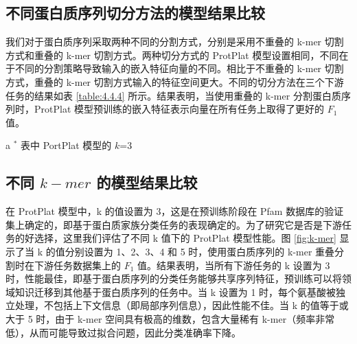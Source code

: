 \subsection{不同蛋白质序列切分方法的模型结果比较}
我们对于蛋白质序列采取两种不同的分割方式，分别是采用不重叠的 k-mer 切割方式和重叠的 k-mer 切割方式。两种切分方式的 ProtPlat 模型设置相同，不同在于不同的分割策略导致输入的嵌入特征向量的不同。相比于不重叠的 k-mer 切割方式，重叠的 k-mer 切割方式输入的特征空间更大。不同的切分方法在三个下游任务的结果如表 \ref{table:4.4.4} 所示。结果表明，当使用重叠的 k-mer 分割蛋白质序列时，ProtPlat 模型预训练的嵌入特征表示向量在所有任务上取得了更好的 $F_1$ 值。

\begin{table}[!htbp]
\label{table:4.4.4}
\centering
{}
\begin{tablenotes}\scriptsize
\item [a] $^*$ 表中 PortPlat 模型的 $k$=3\\
\end{tablenotes}
\end{table}

\subsection{不同 $k-mer$ 的模型结果比较}
在 ProtPlat 模型中，k 的值设置为 3，这是在预训练阶段在 Pfam 数据库的验证集上确定的，即基于蛋白质家族分类任务的表现确定的。为了研究它是否是下游任务的好选择，这里我们评估了不同 k 值下的 ProtPlat 模型性能。图 \ref{fig:k-mer} 显示了当 k 的值分别设置为 1、2、3、4 和 5 时，使用蛋白质序列的 k-mer 重叠分割时在下游任务数据集上的 $F_1$ 值。结果表明，当所有下游任务的 k 设置为 3 时，性能最佳，即基于蛋白质序列的分类任务能够共享序列特征，预训练可以将领域知识迁移到其他基于蛋白质序列的任务中。当 k 设置为 1 时，每个氨基酸被独立处理，不包括上下文信息（即局部序列信息），因此性能不佳。当 k 的值等于或大于 5 时，由于 k-mer 空间具有极高的维数，包含大量稀有 k-mer（频率非常低），从而可能导致过拟合问题，因此分类准确率下降。


